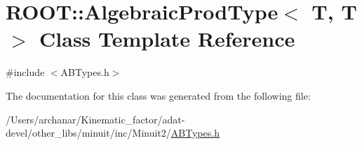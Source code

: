 \hypertarget{classROOT_1_1Minuit2_1_1AlgebraicProdType_3_01T_00_01T_01_4}{}\section{R\+O\+OT\+:\+:Algebraic\+Prod\+Type$<$ T, T $>$ Class Template Reference}
\label{classROOT_1_1Minuit2_1_1AlgebraicProdType_3_01T_00_01T_01_4}


{\ttfamily \#include $<$A\+B\+Types.\+h$>$}



The documentation for this class was generated from the following file\+:\begin{DoxyCompactItemize}
\item 
/\+Users/archanar/\+Kinematic\+\_\+factor/adat-\/devel/other\+\_\+libs/minuit/inc/\+Minuit2/\mbox{\hyperlink{adat-devel_2other__libs_2minuit_2inc_2Minuit2_2ABTypes_8h}{A\+B\+Types.\+h}}\end{DoxyCompactItemize}
